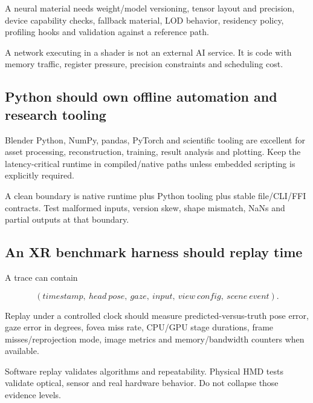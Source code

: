 \hypertarget{06-engine-ii-ch042-neural-shading-is-a-shader-system-problem}{}

A neural material needs weight/model versioning, tensor layout and precision, device capability checks, fallback material, LOD behavior, residency policy, profiling hooks and validation against a reference path.

A network executing in a shader is not an external AI service. It is code with memory traffic, register pressure, precision constraints and scheduling cost.

\subsection{Python should own offline automation and research tooling}\label{06-engine-ii-ch042-python-should-own-offline-automation-and-research-tooling}

\hypertarget{06-engine-ii-ch042-python-should-own-offline-automation-and-research-tooling}{}

Blender Python, NumPy, pandas, PyTorch and scientific tooling are excellent for asset processing, reconstruction, training, result analysis and plotting. Keep the latency-critical runtime in compiled/native paths unless embedded scripting is explicitly required.

A clean boundary is native runtime plus Python tooling plus stable file/CLI/FFI contracts. Test malformed inputs, version skew, shape mismatch, NaNs and partial outputs at that boundary.

\subsection{An XR benchmark harness should replay time}\label{06-engine-ii-ch042-an-xr-benchmark-harness-should-replay-time}

\hypertarget{06-engine-ii-ch042-an-xr-benchmark-harness-should-replay-time}{}

A trace can contain

\[
(timestamp,\ head\ pose,\ gaze,\ input,\ view\ config,\ scene\ event).
\]

Replay under a controlled clock should measure predicted-versus-truth pose error, gaze error in degrees, fovea miss rate, CPU/GPU stage durations, frame misses/reprojection mode, image metrics and memory/bandwidth counters when available.

Software replay validates algorithms and repeatability. Physical HMD tests validate optical, sensor and real hardware behavior. Do not collapse those evidence levels.

